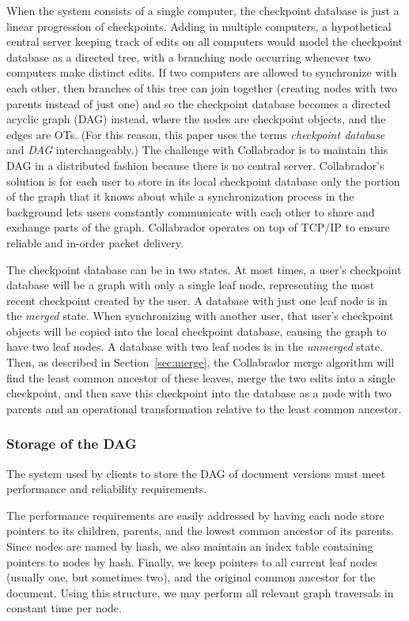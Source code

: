 \documentclass[11pt,titlepage]{article}
\begin{document}
When the system consists of a single computer, the checkpoint database is just
a linear progression of checkpoints. Adding in multiple computers, a
hypothetical central server keeping track of edits on all computers would model
the checkpoint database as a directed tree, with a branching node occurring
whenever two computers make distinct edits. If two computers are allowed to
synchronize with each other, then branches of this tree can join together
(creating nodes with two parents instead of just one) and so the checkpoint
database becomes a directed acyclic graph (DAG) instead, where the nodes are
checkpoint objects, and the edges are OTs.  (For this reason, this paper uses
the terms \emph{checkpoint database} and \emph{DAG} interchangeably.)  The
challenge with Collabrador is to maintain this DAG in a distributed fashion
because there is no central server. Collabrador's solution is for each user to
store in its local checkpoint database only the portion of the graph that it
knows about while a synchronization process in the background lets users
constantly communicate with each other to share and exchange parts of the
graph. Collabrador operates on top of TCP/IP to ensure reliable and in-order
packet delivery.

The checkpoint database can be in two states. At most times, a user's
checkpoint database will be a graph with only a single leaf node,
representing the most recent checkpoint created by the user.  A
database with just one leaf node is in the \emph{merged} state. When
synchronizing with another user, that user's checkpoint objects will
be copied into the local checkpoint database, causing the graph to
have two leaf nodes. A database with two leaf nodes is in the
\emph{unmerged} state. Then, as described in Section~\ref{sec:merge},
the Collabrador merge algorithm will find the least common ancestor of
these leaves, merge the two edits into a single checkpoint, and then
save this checkpoint into the database as a node with two parents and
an operational transformation relative to the least common ancestor.

\subsubsection{Storage of the DAG}
\label{sec:storage-dag}

The system used by clients to store the DAG of document versions must
meet performance and reliability requirements.

The performance requirements are easily addressed by having each node
store pointers to its children, parents, and the lowest common
ancestor of its parents.  Since nodes are named by hash, we also
maintain an index table containing pointers to nodes by hash.
Finally, we keep pointers to all current leaf nodes (usually one, but
sometimes two), and the original common ancestor for the document.
Using this structure, we may perform all relevant graph traversals in
constant time per node.
\end{document}
